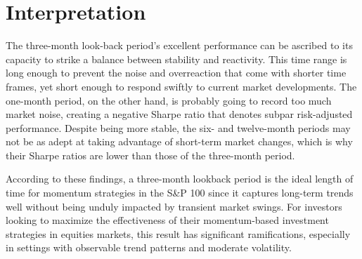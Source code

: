 \documentclass[11pt,a4paper,english,oneside]{book}
\begin{document}
\section{Interpretation}
The three-month look-back period's excellent performance can be ascribed to its capacity to strike a balance between stability and reactivity. This time range is long enough to prevent the noise and overreaction that come with shorter time frames, yet short enough to respond swiftly to current market developments. The one-month period, on the other hand, is probably going to record too much market noise, creating a negative Sharpe ratio that denotes subpar risk-adjusted performance. Despite being more stable, the six- and twelve-month periods may not be as adept at taking advantage of short-term market changes, which is why their Sharpe ratios are lower than those of the three-month period. 

According to these findings, a three-month lookback period is the ideal length of time for momentum strategies in the S\&P 100 since it captures long-term trends well without being unduly impacted by transient market swings. For investors looking to maximize the effectiveness of their momentum-based investment strategies in equities markets, this result has significant ramifications, especially in settings with observable trend patterns and moderate volatility.


\printbibliography
\end{document}
